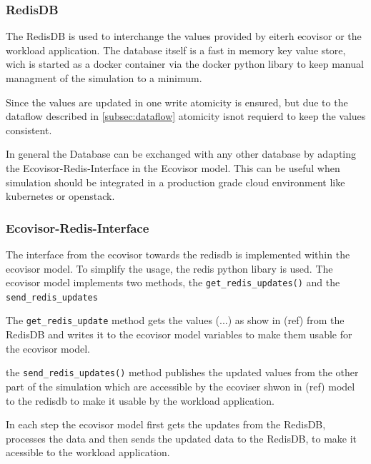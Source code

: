 \subsubsection{RedisDB}
The RedisDB is used to interchange the values provided by eiterh ecovisor or the workload application. The database itself is a fast in memory key value store, wich is started as a docker container via the docker python libary %
to keep manual managment of the simulation to a minimum.

Since the values are updated in one write atomicity is ensured, but due to the dataflow described in \ref{subsec:dataflow}
atomicity isnot requierd to keep the values consistent.

In general the Database can be exchanged with any other database by adapting the Ecovisor-Redis-Interface in the Ecovisor model. This can be useful when simulation should be integrated
in a production grade cloud environment like kubernetes or openstack.


\subsubsection{Ecovisor-Redis-Interface}
The interface from the ecovisor towards the redisdb is implemented within the ecovisor model. To simplify the usage, the redis python libary %
is used. The ecovisor model implements two methods, the
\texttt{get\_redis\_updates()} and the \texttt{send\_redis\_updates} %

The \texttt{get\_redis\_update} method gets the values (...) as show in (ref) from the RedisDB %
and writes it to the ecovisor model variables to make them usable for the ecovisor model.

the \texttt{send\_redis\_updates()} method publishes the updated values from the other part of the simulation which are accessible by the ecoviser shwon in (ref) model to the redisdb to make it
usable by the workload application. %

In each step the ecovisor model first gets the updates from the RedisDB, processes the data and then sends the updated data to the RedisDB, to make it
acessible to the workload application.

